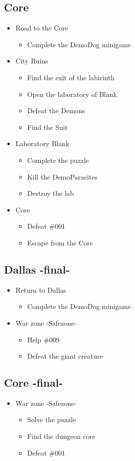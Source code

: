 \subsection{Core}
\begin{itemize}
		\item Road to the Core
		\begin{itemize}	
			\item Complete the DemoDog minigame
		\end{itemize}
	\item City Ruins
	\begin{itemize}
		\item Find the exit of the labirinth
		\item Open the laboratory of Blank
		\item Defeat the Demons
		\item Find the Suit
	\end{itemize}
	\item Laboratory Blank
	\begin{itemize}
		\item Complete the puzzle
		\item Kill the DemoParacites
		\item Destroy the lab
	\end{itemize}
	\item Core
	\begin{itemize}
		\item Defeat \#001
		\item Escape from the Core
	\end{itemize}
\end{itemize}

\subsection{Dallas -final-}
\begin{itemize}
		\item Return to Dallas
		\begin{itemize}	
			\item Complete the DemoDog minigame
		\end{itemize}
	\item War zone -Safezone-
	\begin{itemize}
	\item Help \#009
	\item Defeat the giant creature
	\end{itemize}
\end{itemize}
\subsection{Core -final-}
\begin{itemize}
	\item War zone -Safezone-
	\begin{itemize}
		\item Solve the puzzle
		\item Find the dungeon core
		\item Defeat \#001
	\end{itemize}
\end{itemize}


